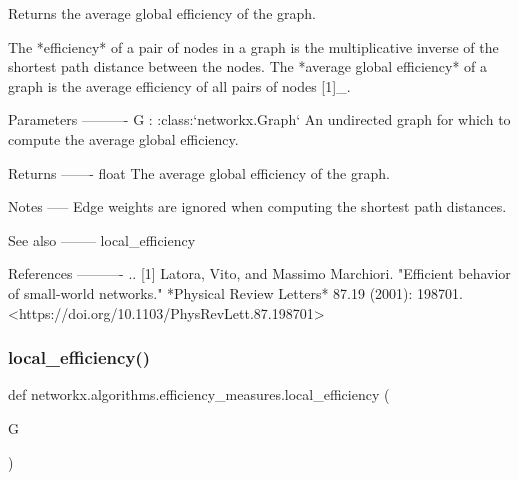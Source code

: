 \begin{DoxyVerb}Returns the average global efficiency of the graph.

The *efficiency* of a pair of nodes in a graph is the multiplicative
inverse of the shortest path distance between the nodes. The *average
global efficiency* of a graph is the average efficiency of all pairs of
nodes [1]_.

Parameters
----------
G : :class:`networkx.Graph`
    An undirected graph for which to compute the average global efficiency.

Returns
-------
float
    The average global efficiency of the graph.

Notes
-----
Edge weights are ignored when computing the shortest path distances.

See also
--------
local_efficiency

References
----------
.. [1] Latora, Vito, and Massimo Marchiori.
       "Efficient behavior of small-world networks."
       *Physical Review Letters* 87.19 (2001): 198701.
       <https://doi.org/10.1103/PhysRevLett.87.198701>\end{DoxyVerb}
 \mbox{\label{namespacenetworkx_1_1algorithms_1_1efficiency__measures_a5b866c32c97ea0ac623533ebcc4949b5}} 
\subsubsection{\texorpdfstring{local\+\_\+efficiency()}{local\_efficiency()}}
{\footnotesize\ttfamily def networkx.\+algorithms.\+efficiency\+\_\+measures.\+local\+\_\+efficiency (\begin{DoxyParamCaption}\item[{}]{G }\end{DoxyParamCaption})}

